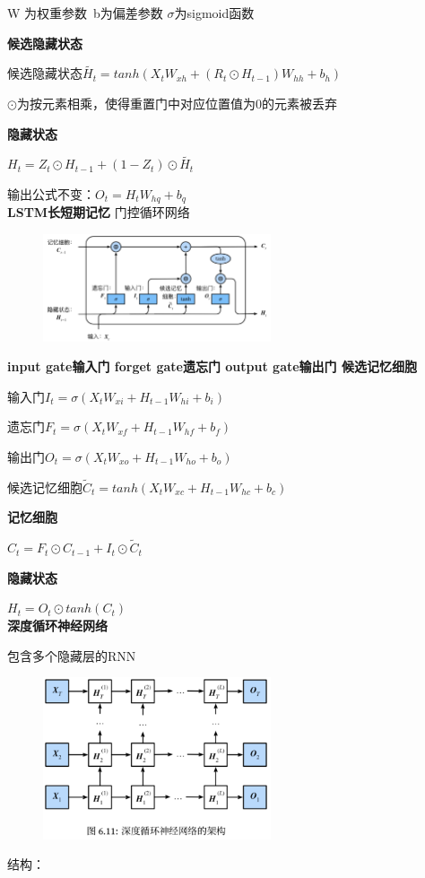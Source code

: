 \documentclass[UTF8]{ctexart}
\begin{document}
  \quad \quad W 为权重参数\ b为偏差参数 $\sigma$为sigmoid函数

  \textbf{候选隐藏状态}

  \quad 候选隐藏状态$\tilde{H_t} = tanh(X_tW_{xh} + (R_t \odot  H_{t-1})W_{hh} + b_h)$

  \quad \quad $\odot$为按元素相乘，使得重置门中对应位置值为0的元素被丢弃

  \textbf{隐藏状态}

  \quad $H_t = Z_t \odot H_{t-1} + (1-Z_t)\odot \tilde{H_t}$
  
  输出公式不变：$O_t = H_tW_{hq} + b_q$\\
\textbf{LSTM长短期记忆} 门控循环网络
  \begin{figure}[H] %
    \centering %
    \includegraphics[width=0.6\textwidth]{note_images/LSTM.png} %
  \end{figure}
  
  \textbf{input gate输入门 forget gate遗忘门 output gate输出门 候选记忆细胞}

  \quad 输入门$I_t = \sigma(X_tW_{xi} + H_{t-1}W_{hi} + b_i)$

  \quad 遗忘门$F_t = \sigma(X_tW_{xf} + H_{t-1}W_{hf} + b_f)$
  
  \quad 输出门$O_t = \sigma(X_tW_{xo} + H_{t-1}W_{ho} + b_o)$

  \quad 候选记忆细胞$\tilde{C}_t = tanh(X_tW_{xc} + H_{t-1}W_{hc} + b_c) $

  \textbf{记忆细胞}

  \quad $C_t = F_t \odot C_{t-1} + I_t \odot \tilde{C}_t$

  \textbf{隐藏状态}

  \quad $H_t = O_t \odot tanh(C_t)$\\
\textbf{深度循环神经网络}

  包含多个隐藏层的RNN
  \begin{figure}[H] %
    \centering %
    \includegraphics[width=0.6\textwidth]{note_images/deep_RNN.png} %
  \end{figure}
  结构：
\end{document}
